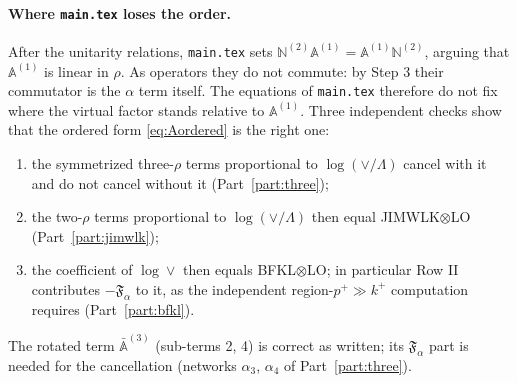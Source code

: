 \paragraph{Where \texttt{main.tex} loses the order.} After the unitarity relations, \texttt{main.tex} sets $\mathbb N^{(2)}\mathbb A^{(1)}=\mathbb A^{(1)}\mathbb N^{(2)}$, arguing that $\mathbb A^{(1)}$ is linear in $\rho$. As operators they do not commute: by Step 3 their commutator is the $\alpha$ term itself. The equations of \texttt{main.tex} therefore do not fix where the virtual factor stands relative to $\mathbb A^{(1)}$. Three independent checks show that the ordered form \eqref{eq:Aordered} is the right one:
\begin{enumerate}
\item the symmetrized three-$\rho$ terms proportional to $\log(\vee/\Lambda)$ cancel with it and do not cancel without it (Part~\ref{part:three});
\item the two-$\rho$ terms proportional to $\log(\vee/\Lambda)$ then equal JIMWLK$\otimes$LO (Part~\ref{part:jimwlk});
\item the coefficient of $\log\vee$ then equals BFKL$\otimes$LO; in particular Row II contributes $-\mathfrak F_\alpha$ to it, as the independent region-$p^+\gg k^+$ computation requires (Part~\ref{part:bfkl}).
\end{enumerate}
The rotated term $\bar{\mathbb A}^{(3)}$ (sub-terms 2, 4) is correct as written; its $\mathfrak F_\alpha$ part is needed for the cancellation (networks $\alpha_3$, $\alpha_4$ of Part~\ref{part:three}).
